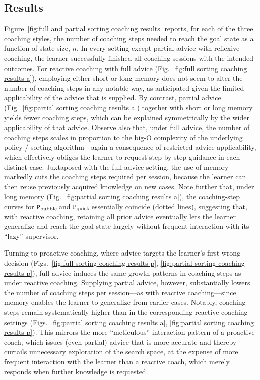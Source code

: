 \documentclass[runningheads]{llncs}
\newcommand{\bubblecoach}{\ensuremath{\texttt{P}_{\rm bubble}}\,}
\newcommand{\quickcoach}{\ensuremath{\texttt{P}_{\rm quick}}\,}
\begin{document}
\subsection{Results}\label{subsec:sorting-results}
%
Figure~\ref{fig:full and partial sorting coaching results} reports, for each of the three coaching styles, the number of coaching steps needed to reach the goal state as a function of state size, $n$. In every setting except partial advice with reflexive coaching, the learner successfully finished all coaching sessions with the intended outcomes. For reactive coaching with full advice (Fig.~\ref{fig:full sorting coaching results a}), employing either short or long memory does not seem to alter the number of coaching steps in any notable way, as anticipated given the limited applicability of the advice that is supplied. By contrast, partial advice (Fig.~\ref{fig:partial sorting coaching results a}) together with short or long memory yields fewer coaching steps, which can be explained symmetrically by the wider applicability of that advice. Observe also that, under full advice, the number of coaching steps scales in proportion to the big-O complexity of the underlying policy / sorting algorithm---again a consequence of restricted advice applicability, which effectively obliges the learner to request step-by-step guidance in each distinct case. Juxtaposed with the full-advice setting, the use of memory markedly cuts the coaching steps required per session, because the learner can then reuse previously acquired knowledge on new cases. Note further that, under long memory (Fig.~\ref{fig:partial sorting coaching results a}), the coaching-step curves for \bubblecoach and \quickcoach essentially coincide (dotted lines), suggesting that, with reactive coaching, retaining all prior advice eventually lets the learner generalize and reach the goal state largely without frequent interaction with its ``lazy'' supervisor.

Turning to proactive coaching, where advice targets the learner's first wrong decision (Figs.~\ref{fig:full sorting coaching results p}, \ref{fig:partial sorting coaching results p}), full advice induces the same growth patterns in coaching steps as under reactive coaching. Supplying partial advice, however, substantially lowers the number of coaching steps per session---as with reactive coaching---since memory enables the learner to generalize from earlier cases. Notably, coaching steps remain systematically higher than in the corresponding reactive-coaching settings (Figs.~\ref{fig:partial sorting coaching results a}, \ref{fig:partial sorting coaching results p}). This mirrors the more ``meticulous'' interaction pattern of a proactive coach, which issues (even partial) advice that is more accurate and thereby curtails unnecessary exploration of the search space, at the expense of more frequent interaction with the learner than a reactive coach, which merely responds when further knowledge is requested.
\end{document}
